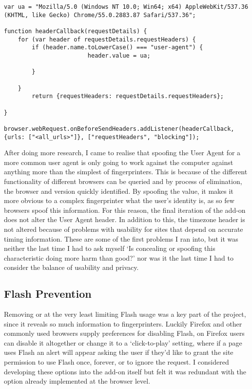 \begin{lstlisting}[caption={The callback used to change the User Agent header}, label={lst:user-agent}]
var ua = "Mozilla/5.0 (Windows NT 10.0; Win64; x64) AppleWebKit/537.36 (KHTML, like Gecko) Chrome/55.0.2883.87 Safari/537.36";

function headerCallback(requestDetails) {
    for (var header of requestDetails.requestHeaders) {
        if (header.name.toLowerCase() === "user-agent") {
                        header.value = ua;
                                
        }
            
    }
        return {requestHeaders: requestDetails.requestHeaders};

}

browser.webRequest.onBeforeSendHeaders.addListener(headerCallback, {urls: ["<all_urls>"]}, ["requestHeaders", "blocking"]);
\end{lstlisting}

After doing more research, I came to realise that spoofing the User Agent for a more common user agent is only going to work against the computer against anything more than the simplest of fingerprinters.
This is because of the different functionality of different browsers can be queried and by process of elimination, the browser and version quickly identified.
By spoofing the value, it makes it more obvious to a complex fingerprinter what the user's identity is, as so few browsers spoof this information.
For this reason, the final iteration of the add-on does not alter the User Agent header.
In addition to this, the timezone header is not altered because of problems with usability for sites that depend on accurate timing information.
These are some of the first problems I ran into, but it was neither the last time I had to ask myself `Is concealing or spoofing this characteristic doing more harm than good?' nor was it the last time I had to consider the balance of usability and privacy.

\subsection{Flash Prevention}

Removing or at the very least limiting Flash usage was a key part of the project, since it reveals so much information to fingerprinters.
Luckily Firefox and other commonly used browsers supply preferences for disabling Flash, on Firefox users can disable it altogether or change it to a `click-to-play' setting, where if a page uses Flash an alert will appear asking the user if they'd like to grant the site permission to use Flash once, forever, or to ignore the request.
I considered developing these options into the add-on itself but felt it was redundant with the option already implemented at the browser level.

